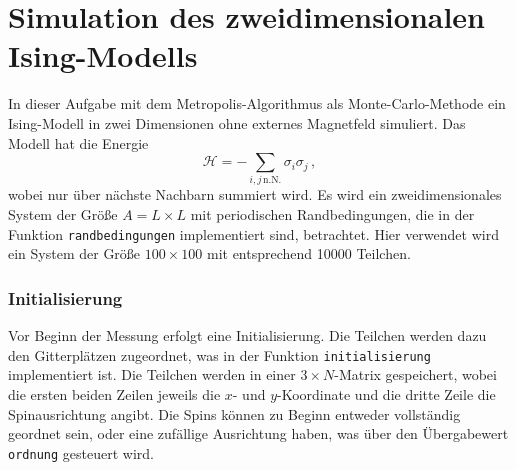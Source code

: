 



\maketitle

\section*{Simulation des zweidimensionalen Ising-Modells}
In dieser Aufgabe mit dem Metropolis-Algorithmus als Monte-Carlo-Methode ein Ising-Modell in zwei Dimensionen 
ohne externes Magnetfeld simuliert. Das Modell hat die Energie
\begin{equation*}
    \mathcal{H} = - \sum_{i, j \, \text{n.N.}} \sigma_i \sigma_j \, ,
\end{equation*}
wobei nur über nächste Nachbarn summiert wird. Es wird ein zweidimensionales System der Größe $A = L \times L$
mit periodischen Randbedingungen, die in der Funktion \texttt{randbedingungen} implementiert sind, betrachtet. 
Hier verwendet wird ein System der Größe $100 \times 100$ mit entsprechend 10000 Teilchen.

\subsubsection*{Initialisierung}
Vor Beginn der Messung erfolgt eine Initialisierung. Die Teilchen werden dazu den Gitterplätzen zugeordnet, was 
in der Funktion \texttt{initialisierung} implementiert ist. Die Teilchen werden in einer $3 \times N$-Matrix gespeichert, 
wobei die ersten beiden Zeilen jeweils die $x$- und $y$-Koordinate und die dritte Zeile die Spinausrichtung 
angibt. Die Spins können zu Beginn entweder vollständig geordnet sein, oder eine zufällige Ausrichtung haben,
was über den Übergabewert \texttt{ordnung} gesteuert wird. 

